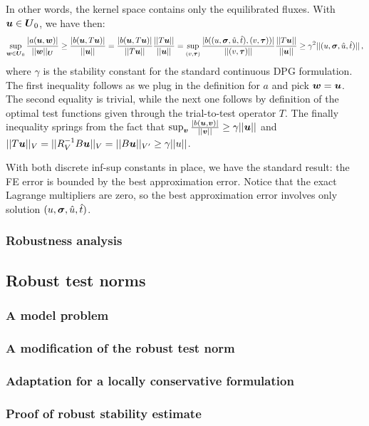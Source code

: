 \documentclass{report}
\begin{document}
In other words, the kernel space contains only the equilibrated fluxes.
With $\boldsymbol u \in \boldsymbol U_0$, we have then:
\begin{equation}
   \sup_{\boldsymbol w \in \boldsymbol U_0} \frac{| a(\boldsymbol u,\boldsymbol w) |}{|| \boldsymbol w ||_{\boldsymbol U} }
   \geq \frac{| b(\boldsymbol u,T \boldsymbol u) |}{|| \boldsymbol u ||}
   = \frac{| b(\boldsymbol u,T \boldsymbol u) |}{|| T\boldsymbol u ||}\frac{||T\boldsymbol u||}{||\boldsymbol u||}
   = \sup_{(v,\boldsymbol\tau)}\frac{| b((u,\boldsymbol\sigma,\hat{u},\hat{t}), (v,\boldsymbol\tau)) |}{|| (v,\boldsymbol\tau) ||}
   \frac{||T\boldsymbol u||}{||\boldsymbol u||}
   \geq \gamma^2 || (u,\boldsymbol\sigma,\hat{u},\hat{t}) ||\,,
\end{equation}
where $\gamma$ is the stability constant for the standard continuous DPG formulation.
The first inequality follows as we plug in the definition for $a$ and pick
$\boldsymbol w=\boldsymbol u$. The second equality is trivial, while the next one follows by definition of the optimal test
functions given through the trial-to-test operator $T$. The finally inequality
springs from the fact that
$\sup_{\boldsymbol v}\frac{|b(\boldsymbol u,\boldsymbol v)|}{||\boldsymbol v||}\geq\gamma||\boldsymbol u||$ and
$||T\boldsymbol u||_V=||R_V^{-1}B\boldsymbol u||_V=||B\boldsymbol u||_{V'}\geq\gamma||u||$.

With both discrete inf-sup constants in place, we have the standard result: the FE error
is bounded by the best approximation error. Notice that the exact Lagrange multipliers
are zero, so the best approximation error involves only solution $(u,\boldsymbol\sigma,\hat{u},\hat{t})$.
\subsubsection{Robustness analysis}

\subsection{Robust test norms}
\subsubsection{A model problem}
\subsubsection{A modification of the robust test norm}
\subsubsection{Adaptation for a locally conservative formulation}
\subsubsection{Proof of robust stability estimate}
\end{document}
